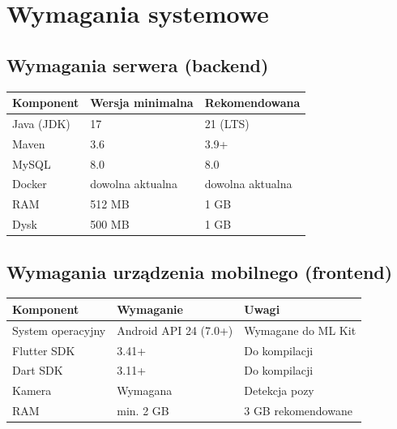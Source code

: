 \documentclass[12pt,a4paper]{article}
\begin{document}
\section{Wymagania systemowe}

\subsection{Wymagania serwera (backend)}

\begin{center}
\begin{tabular}{lll}
  \toprule
  \textbf{Komponent} & \textbf{Wersja minimalna} & \textbf{Rekomendowana} \\
  \midrule
  Java (JDK)  & 17     & 21 (LTS) \\
  Maven       & 3.6    & 3.9+ \\
  MySQL       & 8.0    & 8.0 \\
  Docker      & dowolna aktualna & dowolna aktualna \\
  RAM         & 512 MB & 1 GB \\
  Dysk        & 500 MB & 1 GB \\
  \bottomrule
\end{tabular}
\end{center}

\subsection{Wymagania urządzenia mobilnego (frontend)}

\begin{center}
\begin{tabular}{lll}
  \toprule
  \textbf{Komponent} & \textbf{Wymaganie} & \textbf{Uwagi} \\
  \midrule
  System operacyjny & Android API 24 (7.0+) & Wymagane do ML Kit \\
  Flutter SDK       & 3.41+                 & Do kompilacji \\
  Dart SDK          & 3.11+                 & Do kompilacji \\
  Kamera            & Wymagana              & Detekcja pozy \\
  RAM               & min. 2 GB             & 3 GB rekomendowane \\
  \bottomrule
\end{tabular}
\end{center}

\newpage
\end{document}
